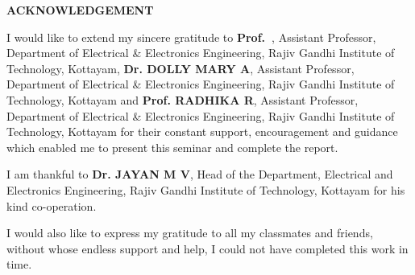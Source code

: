 \documentclass[12pt,a4paper]{reportmod}
\begin{document}
\newpage
\thispagestyle{empty}%
\begin{center}
\begin{large}
\textbf{ACKNOWLEDGEMENT}
\end{large}
\end{center}
\begin{large}
\par I would like to extend my sincere gratitude to \textbf{\mbox{Prof. \guide}}, Assistant Professor, Department of Electrical \& Electronics Engineering, Rajiv Gandhi Institute of Technology, Kottayam, \textbf{Dr. DOLLY MARY A}, Assistant Professor, Department of Electrical \& Electronics Engineering, Rajiv Gandhi Institute of Technology, Kottayam and \textbf{Prof. RADHIKA R}, Assistant Professor, Department of Electrical \& Electronics Engineering, Rajiv Gandhi Institute of Technology, Kottayam for their constant support, encouragement and guidance which enabled me to present this seminar and complete the report.
\par I am thankful to \textbf{Dr. JAYAN M V}, Head of the Department, Electrical and Electronics Engineering, Rajiv Gandhi Institute of Technology, Kottayam for his kind co-operation.
\par I would also like to express my gratitude to all my classmates and friends, without whose endless support and help, I could not have completed this work in time.\\
\begin{flushright}
\name
\end{flushright}
\end{large}
\end{document}
